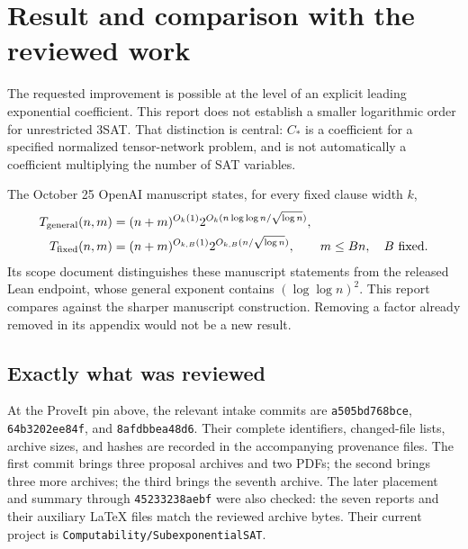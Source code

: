 \documentclass[11pt,letterpaper]{article}
\numberwithin{equation}{section}
\theoremstyle{definition}\newtheorem{definition}[theorem]{Definition}
\theoremstyle{remark}\newtheorem{remark}[theorem]{Remark}
\newcommand{\Cstar}{C_*}
\begin{document}
\section{Result and comparison with the reviewed work}
\label{sec:result}

The requested improvement is possible at the level of an explicit leading
exponential coefficient. This report does not establish a smaller
logarithmic order for unrestricted 3SAT. That distinction is central:
$\Cstar$ is a coefficient for a specified normalized tensor-network problem,
and is not automatically a coefficient multiplying the number of SAT
variables.

The October 25 OpenAI manuscript \cite{openai} states, for every fixed
clause width $k$,
\begin{align}
 T_{\rm general}(n,m)&=(n+m)^{O_k(1)}
       2^{O_k(n\log\log n/\sqrt{\log n})},\label{eq:general}\\
 T_{\rm fixed}(n,m)&=(n+m)^{O_{k,B}(1)}
       2^{O_{k,B}(n/\sqrt{\log n})},
       \qquad m\le Bn,\quad B\text{ fixed}.\label{eq:fixed}
\end{align}
Its scope document \cite{scope} distinguishes these manuscript statements
from the released Lean endpoint, whose general exponent contains
$(\log\log n)^2$. This report compares against the sharper manuscript
construction. Removing a factor already removed in its appendix would
not be a new result.

\subsection{Exactly what was reviewed}

At the ProveIt pin above, the relevant intake commits are
\texttt{a505bd768bce}, \texttt{64b3202ee84f}, and \texttt{8afdbbea48d6}.
Their complete identifiers, changed-file lists, archive sizes, and hashes
are recorded in the accompanying provenance files. The first commit brings
three proposal archives and two PDFs; the second brings three more archives;
the third brings the seventh archive. The later placement and summary
through \texttt{45233238aebf} were also checked: the seven reports and their
auxiliary LaTeX files match the reviewed archive bytes. Their current project
is \nolinkurl{Computability/SubexponentialSAT}.
\end{document}
